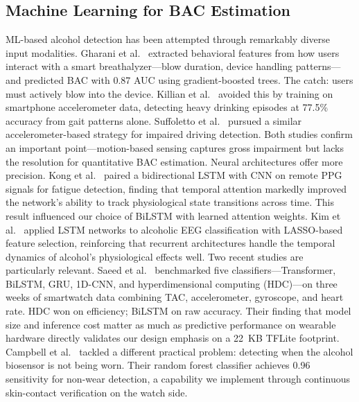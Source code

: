 \documentclass[HARVARD,Times2COL]{WileyNJDv5} %
\begin{document}
\subsection{Machine Learning for BAC Estimation}
ML-based alcohol detection has been attempted through remarkably diverse input modalities. Gharani et al.~\citep{gharani2021} extracted behavioral features from how users interact with a smart breathalyzer---blow duration, device handling patterns---and predicted BAC with 0.87 AUC using gradient-boosted trees. The catch: users must actively blow into the device. Killian et al.~\citep{killian2019} avoided this by training on smartphone accelerometer data, detecting heavy drinking episodes at 77.5\% accuracy from gait patterns alone. Suffoletto et al.~\citep{suffoletto2020} pursued a similar accelerometer-based strategy for impaired driving detection. Both studies confirm an important point---motion-based sensing captures gross impairment but lacks the resolution for quantitative BAC estimation.
Neural architectures offer more precision. Kong et al.~\citep{kong2024} paired a bidirectional LSTM with CNN on remote PPG signals for fatigue detection, finding that temporal attention markedly improved the network's ability to track physiological state transitions across time. This result influenced our choice of BiLSTM with learned attention weights. Kim et al.~\citep{kim2024eeg} applied LSTM networks to alcoholic EEG classification with LASSO-based feature selection, reinforcing that recurrent architectures handle the temporal dynamics of alcohol's physiological effects well.
Two recent studies are particularly relevant. Saeed et al.~\citep{saeed2025} benchmarked five classifiers---Transformer, BiLSTM, GRU, 1D-CNN, and hyperdimensional computing (HDC)---on three weeks of smartwatch data combining TAC, accelerometer, gyroscope, and heart rate. HDC won on efficiency; BiLSTM on raw accuracy. Their finding that model size and inference cost matter as much as predictive performance on wearable hardware directly validates our design emphasis on a 22~KB TFLite footprint. Campbell et al.~\citep{biosensor2025nonwear} tackled a different practical problem: detecting when the alcohol biosensor is not being worn. Their random forest classifier achieves 0.96 sensitivity for non-wear detection, a capability we implement through continuous skin-contact verification on the watch side.
\end{document}
